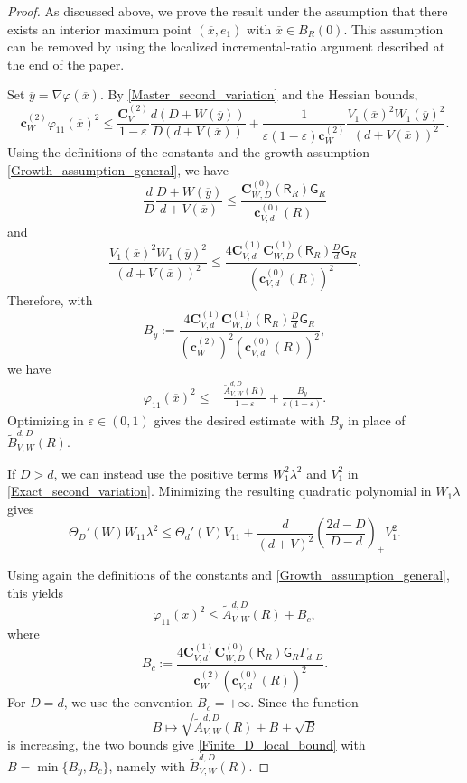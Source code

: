 \documentclass[11pt,a4paper,reqno]{amsart}
\numberwithin{equation}{section}
\theoremstyle{definition}
\newcommand{\<}{\ensuremath \leq}
\renewcommand{\>}{\ensuremath \geq}
\renewcommand{\epsilon}{\varepsilon}
\newcommand{\ThetaPar}{\Theta}
\newcommand{\CV}{\mathbf{C}_V}
\newcommand{\cW}{\mathbf{c}_W}
\newcommand{\CVp}[1]{\mathbf{C}_{V,#1}}
\newcommand{\CWp}[1]{\mathbf{C}_{W,#1}}
\newcommand{\cVp}[1]{\mathbf{c}_{V,#1}}
\begin{document}
\begin{proof}
As discussed above, we prove the result under the assumption that there exists an interior  maximum point $(\overline x,e_1)$ with $\overline x\in B_R(0)$. This assumption can be removed by using the localized incremental-ratio argument described at the end of the paper.

Set $\overline y=\nabla\varphi(\overline x)$. By \cref{Master_second_variation} and the Hessian bounds,
\[
\cW^{(2)}\varphi_{11}(\overline x)^2
\le
\frac{\CV^{(2)}}{1-\epsilon}
\frac{d(D+W(\overline y))}{D(d+V(\overline x))} 
+
\frac{1}{\epsilon(1-\epsilon)\cW^{(2)}}
\frac{V_1(\overline x)^2W_1(\overline y)^2}{(d+V(\overline x))^2}.
\]
Using the definitions of the constants and the growth assumption \cref{Growth_assumption_general}, we have
\[
    \frac{d}{D}\frac{D+W(\overline y)}{d+V(\overline x)}
    \le
    \frac{\CWp{D}^{(0)}(\mathsf R_R)\mathsf G_R}{\cVp{d}^{(0)}(R)}
\]
and
\[
    \frac{V_1(\overline x)^2W_1(\overline y)^2}{(d+V(\overline x))^2}
    \le
    \frac{4\CVp{d}^{(1)}\CWp{D}^{(1)}(\mathsf R_R)\frac{D}{d}\mathsf G_R}{(\cVp{d}^{(0)}(R))^2}.
\]
Therefore, with
\[
    B_y:=
    \frac{4\CVp{d}^{(1)}\CWp{D}^{(1)}(\mathsf R_R)\frac{D}{d}\mathsf G_R}
    {(\cW^{(2)})^2(\cVp{d}^{(0)}(R))^2},
\]
we have
\[
    \begin{aligned}
    \varphi_{11}(\overline x)^2
    \le{}&
    \frac{\widetilde A_{V,W}^{d,D}(R)}{1-\epsilon}
    +
    \frac{B_y}{\epsilon(1-\epsilon)}.
    \end{aligned}
\]
Optimizing in $\epsilon\in(0,1)$ gives the desired estimate with $B_y$ in place of $\widetilde B_{V,W}^{d,D}(R)$.

If $D>d$, we can instead use the positive terms $W_1^2\lambda^2$ and $V_1^2$ in \cref{Exact_second_variation}. Minimizing the resulting quadratic polynomial in $W_1\lambda$ gives
\[
    \ThetaPar_D'(W)W_{11}\lambda^2
    \le
    \ThetaPar_d'(V)V_{11}
    +
    \frac{d}{(d+V)^2}
    \left(\frac{2d-D}{D-d}\right)_+
    V_1^2.
\]





Using again the definitions of the constants and \cref{Growth_assumption_general}, this yields
\[
    \varphi_{11}(\overline x)^2
    \le
    \widetilde A_{V,W}^{d,D}(R)
    +
    B_c,
\]
where
\[
    B_c:=
    \frac{4\CVp{d}^{(1)}\CWp{D}^{(0)}(\mathsf R_R)\mathsf G_R\Gamma_{d,D}}
    {\cW^{(2)}(\cVp{d}^{(0)}(R))^2}.
\]
For $D=d$, we use the convention $B_c=+\infty$. Since the function
\[
    B\mapsto \sqrt{\widetilde A_{V,W}^{d,D}(R)+B}+\sqrt B
\]
is increasing, the two bounds give \cref{Finite_D_local_bound} with $B=\min\{B_y,B_c\}$, namely with $\widetilde B_{V,W}^{d,D}(R)$.
\end{proof}
\end{document}
